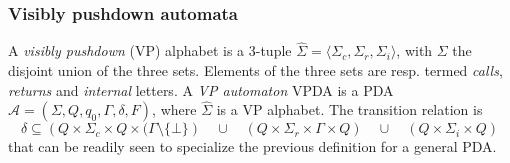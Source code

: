 \documentclass[3p,11pt]{elsarticle}
\begin{document}
\subsubsection*{Visibly pushdown automata}
A \emph{visibly pushdown} (VP) \cite{AluMad04} alphabet is a 3-tuple $\widehat{\Sigma}= \langle\Sigma_{c}, \Sigma_{r},\Sigma_{i}\rangle$, with $\Sigma$ the disjoint union of the three sets.  Elements of the three sets are resp. termed \emph{calls}, \emph{returns} and \emph{internal} letters.
\label{DetvisibPushdownAut} A  \emph{VP automaton} VPDA is a  PDA $\mathcal{A}=(\Sigma,Q, q_0, \Gamma, \delta, F)$, where $\widehat{\Sigma}$ is a VP alphabet. The transition relation is
$$
\delta\subseteq \left(Q \times \Sigma_{c} \times Q \times (\Gamma \setminus \{\bot\}\right) \quad \cup\quad \left(Q \times \Sigma_{r} \times \Gamma \times Q \right) \quad\cup \quad\left( Q \times \Sigma_{i} \times Q \right)
$$
that can be readily seen to specialize the previous definition for a general PDA.
\end{document}
